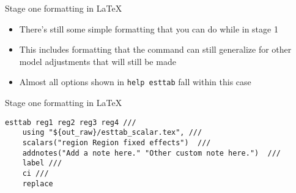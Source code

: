 \documentclass[aspectratio=169]{beamer}
\begin{document}
\begin{frame}[fragile]{Stage one formatting in \LaTeX }
\begin{itemize}
    \item There's still some simple formatting that you can do while in stage 1
    \item This includes formatting that the command can still generalize for other model adjustments that will still be made
    \item Almost all options shown in \texttt{help esttab} fall within this case
\end{itemize}
\end{frame}

\begin{frame}[fragile]{Stage one formatting in \LaTeX }
\begin{multicols}{2}
\begin{lstlisting}
esttab reg1 reg2 reg3 reg4 ///
    using "${out_raw}/esttab_scalar.tex", ///
    scalars("region Region fixed effects")  ///
    addnotes("Add a note here." "Other custom note here.")  ///
    label ///
    ci ///
    replace
\end{lstlisting}

\begin{table}
\begin{adjustbox}{max width = .45\textwidth}

\end{adjustbox}
\end{table}
\end{multicols}
\end{frame}
\end{document}
